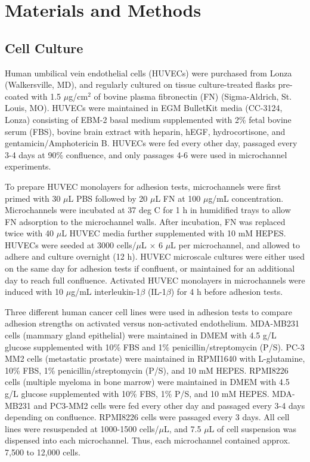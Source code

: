 \section{Materials and Methods}

\subsection{Cell Culture}

Human umbilical vein endothelial cells (HUVECs) were purchased from Lonza (Walkersville, MD), and regularly cultured on tissue culture-treated flasks pre-coated with 1.5 $\mu$g/cm$^2$ of bovine plasma fibronectin (FN) (Sigma-Aldrich, St. Louis, MO). HUVECs were maintained in EGM BulletKit media (CC-3124, Lonza) consisting of EBM-2 basal medium supplemented with 2\% fetal bovine serum (FBS), bovine brain extract with heparin, hEGF, hydrocortisone, and gentamicin/Amphotericin B. HUVECs were fed every other day, passaged every 3-4 days at 90\% confluence, and only passages 4-6 were used in microchannel experiments. 

To prepare HUVEC monolayers for adhesion tests, microchannels were first primed with 30 $\mu$L PBS followed by 20 $\mu$L FN at 100 $\mu$g/mL concentration. Microchannels were incubated at 37 deg C for 1 h in humidified trays to allow FN adsorption to the microchannel walls. After incubation, FN was replaced twice with 40 $\mu$L HUVEC media further supplemented with 10 mM HEPES. HUVECs were seeded at 3000 cells/$\mu$L $\times$ 6 $\mu$L per microchannel, and allowed to adhere and culture overnight (12 h). HUVEC microscale cultures were either used on the same day for adhesion tests if confluent, or maintained for an additional day to reach full confluence. Activated HUVEC monolayers in microchannels were induced with 10 $\mu$g/mL interleukin-1$\beta$ (IL-1$\beta$) for 4 h before adhesion tests.

Three different human cancer cell lines were used in adhesion tests to compare adhesion strengths on activated versus non-activated endothelium. MDA-MB231 cells (mammary gland epithelial) were maintained in DMEM with 4.5 g/L glucose supplemented with 10\% FBS and 1\% penicillin/streptomycin (P/S). PC-3 MM2 cells (metastatic prostate) were maintained in RPMI1640 with L-glutamine, 10\% FBS, 1\% penicillin/streptomycin (P/S), and 10 mM HEPES. RPMI8226 cells (multiple myeloma in bone marrow) were maintained in DMEM with 4.5 g/L glucose supplemented with 10\% FBS, 1\% P/S, and 10 mM HEPES.  MDA-MB231 and PC3-MM2 cells were fed every other day and passaged every 3-4 days depending on confluence. RPMI8226 cells were passaged every 3 days. All cell lines were resuspended at 1000-1500 cells/$\mu$L, and 7.5 $\mu$L of cell suspension was dispensed into each microchannel. Thus, each microchannel contained approx. 7,500 to 12,000 cells.

